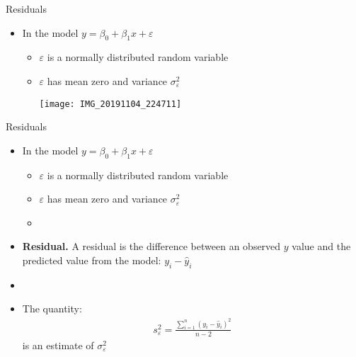 \documentclass[xcolor=dvipsnames]{beamer}
\begin{document}
\begin{frame}{Residuals}
	\begin{itemize}
		\item In the model $y = \beta_0 + \beta_1 x + \varepsilon$
		\begin{itemize}
			\item $\varepsilon$ is a normally distributed random variable
			\item $\varepsilon$ has mean zero and variance $\sigma^2_{\varepsilon}$
			\vspace{1mm}
			\begin{center}
				\texttt{[image: IMG\_20191104\_224711]}
			\end{center}
		\end{itemize} 
	\end{itemize}
\end{frame}

\begin{frame}{Residuals}
\begin{itemize}
	\item In the model $y = \beta_0 + \beta_1 x + \varepsilon$
	\begin{itemize}
		\item $\varepsilon$ is a normally distributed random variable
		\item $\varepsilon$ has mean zero and variance $\sigma^2_{\varepsilon}$
		\item[]
	\end{itemize} 
	\item \textbf{Residual.} A residual is the difference between an observed $y$ value and the predicted value from the model: $y_i - \hat{y}_i$
	\item[]
	\item The quantity: 
	\begin{gather*}
		s^2_{\varepsilon} = \frac{\sum_{i=1}^{n}\left(y_i - \hat{y}_i\right)^2}{n-2}
	\end{gather*}
	is an estimate of $\sigma^2_{\varepsilon}$
\end{itemize}
\end{frame}
\end{document}
